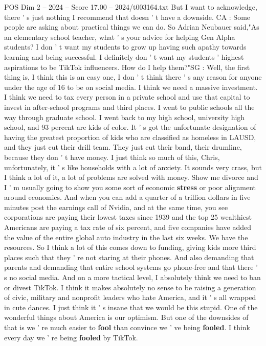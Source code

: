 \begin{textsample}{POS Dim 2 – 2024 – Score 17.00 – 2024/t003164.txt}
But I want to acknowledge, there ' s just nothing I recommend that doesn ' t have a downside.
CA : Some people are asking about practical things we can do.
So Adrian Neubauer said,"As an elementary school teacher, what ' s your advice for helping Gen Alpha students?
I don ' t want my students to grow up having such apathy towards learning and being successful.
I definitely don ' t want my students ' highest aspirations to be TikTok influencers.
How do I help them?"SG : Well, the first thing is, I think this is an easy one, I don ' t think there ' s any reason for anyone under the age of 16 to be on social media.
I think we need a massive investment.
I think we need to tax every person in a private school and use that capital to invest in after-school programs and third places.
I went to public schools all the way through graduate school.
I went back to my high school, university high school, and 93 percent are kids of color.
It ' s got the unfortunate designation of having the greatest proportion of kids who are classified as homeless in LAUSD, and they just cut their drill team.
They just cut their band, their drumline, because they don ' t have money.
I just think so much of this, Chris, unfortunately, it ' s like households with a lot of anxiety.
It sounds very crass, but I think a lot of it, a lot of problems are solved with money.
Show me divorce and I ' m usually going to show you some sort of economic \textbf{stress} or poor alignment around economics.
And when you can add a quarter of a trillion dollars in five minutes post the earnings call of Nvidia, and at the same time, you see corporations are paying their lowest taxes since 1939 and the top 25 wealthiest Americans are paying a tax rate of six percent, and five companies have added the value of the entire global auto industry in the last six weeks.
We have the resources.
So I think a lot of this comes down to funding, giving kids more third places such that they ' re not staring at their phones.
And also demanding that parents and demanding that entire school systems go phone-free and that there ' s no social media.
And on a more tactical level, I absolutely think we need to ban or divest TikTok.
I think it makes absolutely no sense to be raising a generation of civic, military and nonprofit leaders who hate America, and it ' s all wrapped in cute dances.
I just think it ' s insane that we would be this stupid.
One of the wonderful things about America is our optimism.
But one of the downsides of that is we ' re much easier to \textbf{fool} than convince we ' ve being \textbf{fooled}.
I think every day we ' re being \textbf{fooled} by TikTok.

\end{textsample}
